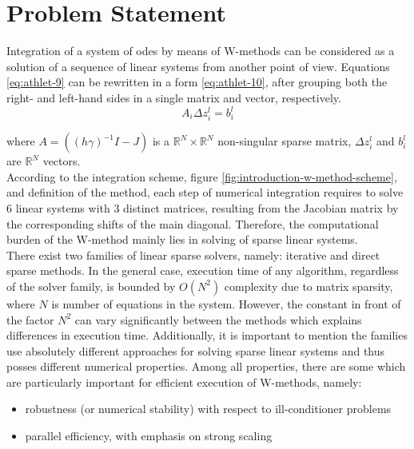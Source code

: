 \chapter{Problem Statement}\label{chapter:problem-statment}


Integration of a system of \acrshort{ode}s by means of W-methods can be considered as a solution of a sequence of linear systems from another point of view. Equations \ref{eq:athlet-9} can be rewritten in a form \ref{eq:athlet-10}, after grouping both the right- and left-hand sides in a single matrix and vector, respectively.\\


\begin{equation} \label{eq:athlet-10}
	A_{i} \Delta z^{l}_{i} =  b^{l}_{i} 
\end{equation}

where $A = ((h \gamma)^{-1}I - J)$ is a $\mathbb{R}^{N} \times \mathbb{R}^{N}$ non-singular sparse matrix, $\Delta z^{l}_{i}$  and $b^{l}_{i}$ are $\mathbb{R}^{N}$ vectors.\\


According to the integration scheme, figure \ref{fig:introduction-w-method-scheme}, and definition of the method, each step of numerical integration requires to solve 6 linear systems with 3 distinct matrices, resulting from the Jacobian matrix by the corresponding shifts of the main diagonal. Therefore, the computational burden of the W-method mainly lies in solving of sparse linear systems.\\


There exist two families of linear sparse solvers, namely: iterative and direct sparse methods. In the general case, execution time of any algorithm, regardless of the solver family, is bounded by $O(N^2)$ complexity due to matrix sparsity, where $N$ is number of equations in the system. However, the constant in front of the factor $N^2$ can vary significantly between the methods which explains differences in execution time. Additionally, it is important to mention the families use absolutely different approaches for solving sparse linear systems and thus posses different numerical properties. Among all  properties, there are some which are particularly important for efficient execution of W-methods, namely: \\


\begin{itemize}
	\item robustness (or numerical stability) with respect to ill-conditioner problems
	\item parallel efficiency, with emphasis on strong scaling 
\end{itemize}


